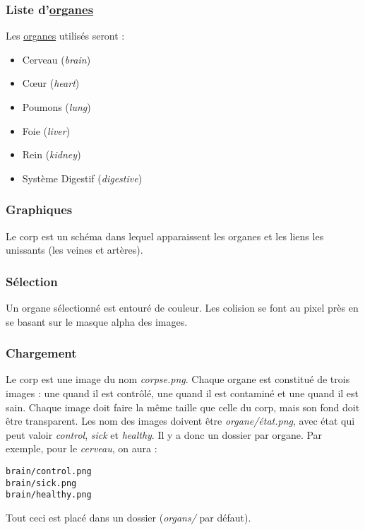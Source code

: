 \documentclass{article}
\begin{document}
\subsubsection{Liste d'\hyperref[organe]{organes}}
Les \hyperref[organe]{organes} utilisés seront :
\begin{itemize}
	\item Cerveau (\emph{brain})
	\item Cœur (\emph{heart})
	\item Poumons (\emph{lung})
	\item Foie (\emph{liver})
	\item Rein (\emph{kidney})
	\item Système Digestif (\emph{digestive})
\end{itemize}

\subsubsection{Graphiques}
Le corp est un schéma dans lequel apparaissent les organes et les liens les unissants (les veines et artères).

\subsubsection{Sélection}
Un organe sélectionné est entouré de couleur. Les colision se font au pixel près en se basant sur le masque alpha des images.

\subsubsection{Chargement}
Le corp est une image du nom \emph{corpse.png}. Chaque organe est constitué de trois images : une quand il est contrôlé, une quand il est contaminé et une quand il est sain. Chaque image doit faire la même taille que celle du corp, mais son fond doit être transparent. Les nom des images doivent être \emph{organe/état.png}, avec état qui peut valoir \emph{control}, \emph{sick} et \emph{healthy}. Il y a donc un dossier par organe.
Par exemple, pour le \emph{cerveau}, on aura :
\begin{verbatim}
brain/control.png
brain/sick.png
brain/healthy.png
\end{verbatim}
Tout ceci est placé dans un dossier (\emph{organs/} par défaut).
\end{document}
